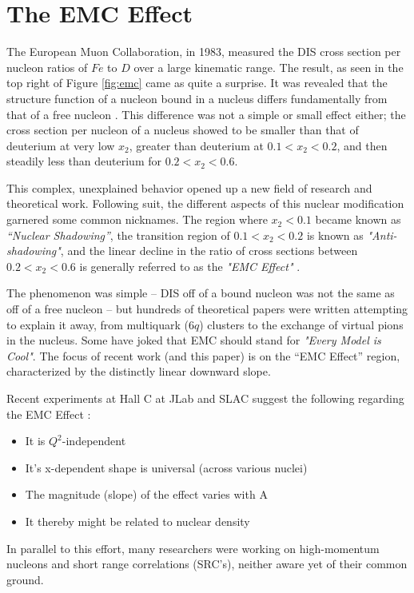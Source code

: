 \section{The EMC Effect}

The European Muon Collaboration, in 1983, measured the DIS cross section per nucleon ratios of $Fe$ to $D$ over a large kinematic range.  The result, as seen in the top right of Figure \ref{fig:emc} came as quite a surprise.  It was revealed that the structure function of a nucleon bound in a nucleus differs fundamentally from that of a free nucleon  \cite{Aubert:1983xm}.  This difference was not a simple or small effect either; the cross section per nucleon of a nucleus showed to be smaller than that of deuterium at very low $x_2$, greater than deuterium at $0.1<x_2<0.2$, and then steadily less than deuterium for $0.2<x_2<0.6$. 

This complex, unexplained behavior opened up a new field of research and theoretical work. Following suit, the different aspects of this nuclear modification garnered some common nicknames.  The region where $x_2<0.1$ became known as \emph{``Nuclear Shadowing''}, the transition region of $0.1<x_2<0.2$ is known as \emph{"Anti-shadowing"}, and the linear decline in the ratio of cross sections between $0.2<x_2<0.6$ is generally referred to as the \emph{"EMC Effect"} \cite{Geesaman:1995yd}.

The phenomenon was simple -- DIS off of a bound nucleon was not the same as off of a free nucleon -- but hundreds of theoretical papers were written attempting to explain it away, from multiquark ($6q$) clusters to the exchange of virtual pions in the nucleus. Some have joked that EMC should stand for \emph{"Every Model is Cool"}. The focus of recent work (and this paper) is on the ``EMC Effect'' region, characterized by the distinctly linear downward slope.

Recent experiments at Hall C at JLab and SLAC suggest the following regarding the EMC Effect \cite{Seely:2009gt}:
\begin{itemize}
	\item
	It is $Q^2$-independent
	\item
	It's x-dependent shape is universal (across various nuclei)
	\item
	The magnitude (slope) of the effect varies with A
	\item
	It thereby might be related to nuclear density
\end{itemize}

In parallel to this effort, many researchers were working on high-momentum nucleons and short range correlations (SRC's), neither aware yet of their common ground.